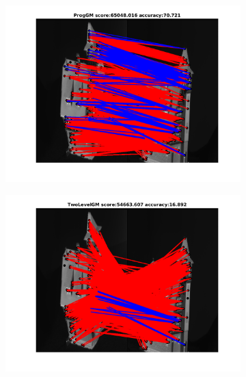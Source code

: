 \documentclass[
	fontsize=12pt,
	paper=a4,
	twoside=false,
	numbers=noenddot,
	plainheadsepline,
	toc=listof,
	toc=bibliography
]{scrartcl}
\begin{document}
\begin{figure}[h]	
	\begin{subfigure}[b]{0.3\textwidth}
		\centering
		\includegraphics[scale=0.25]{"fig_ver2608/RealImages/HouseSeq/no_descr/using_cpd_afftrafo/ext_solution/fi_11_ProgGM"}  
	\end{subfigure}%
	\begin{subfigure}[b]{0.3\textwidth}
		\centering
		\includegraphics[scale=0.25]{"fig_ver2608/RealImages/HouseSeq/no_descr/using_cpd_afftrafo/ext_solution/fi_11_TwoLevelGM"}  
	\end{subfigure} 
	\begin{subfigure}[b]{0.3\textwidth}
		\centering

\end{subfigure}
\end{figure}
\end{document}
